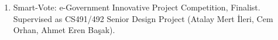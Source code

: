 
\begin{enumerate}
  \item
    Smart-Vote: e-Government Innovative Project Competition, Finalist. Supervised as CS491/492 Senior Design Project (Atalay Mert İleri, Cem Orhan, Ahmet Eren Başak).
\end{enumerate}
